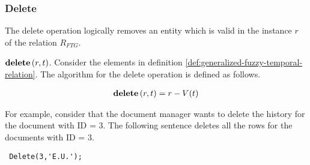 \subsubsection{\label{subsubsec:delete-fuzzy-temporal}Delete}
The delete operation logically removes an entity which is valid in the instance $r$ of the relation $R_{FTG}$.

\begin{definition}
 \emph{$\mbox{\textbf{delete}} \left(r, t \right) $}.
Consider the elements in definition \ref{def:generalized-fuzzy-temporal-relation}. The algorithm for the delete operation is defined as follows.
\end{definition}


\begin{align}
\label{eq:delete-fuzzy-temporal}
\mbox{\textbf{delete}} \left(r, t\right) =
\nonumber
r - V(t)
\end{align}

For example, consider that the document manager wants to delete the history for the document with ID = 3. The following sentence deletes all the rows for the documents with ID = 3.

\begin{verbatim}
 Delete(3,'E.U.');
\end{verbatim}


% 
% 
% 
